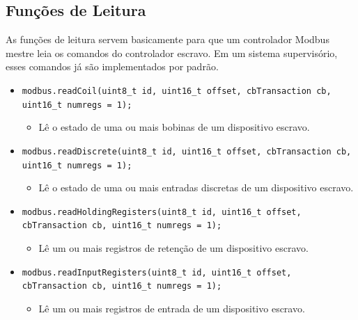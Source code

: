 \subsection{Funções de Leitura}
As funções de leitura servem basicamente para que um controlador Modbus mestre leia os comandos do controlador escravo. Em um sistema supervisório, esses comandos já são implementados por padrão.
\begin{itemize}
    \item \texttt{modbus.readCoil(uint8\_t id, uint16\_t offset, cbTransaction cb, uint16\_t numregs = 1);}
    \begin{itemize}
        \item Lê o estado de uma ou mais bobinas de um dispositivo escravo.
    \end{itemize}
    \item \texttt{modbus.readDiscrete(uint8\_t id, uint16\_t offset, cbTransaction cb, uint16\_t numregs = 1);}
    \begin{itemize}
        \item Lê o estado de uma ou mais entradas discretas de um dispositivo escravo.
    \end{itemize}
    \item \texttt{modbus.readHoldingRegisters(uint8\_t id, uint16\_t offset, cbTransaction cb, uint16\_t numregs = 1);}
    \begin{itemize}
        \item Lê um ou mais registros de retenção de um dispositivo escravo.
    \end{itemize}
    \item \texttt{modbus.readInputRegisters(uint8\_t id, uint16\_t offset, cbTransaction cb, uint16\_t numregs = 1);}
    \begin{itemize}
        \item Lê um ou mais registros de entrada de um dispositivo escravo.
    \end{itemize}
\end{itemize}

